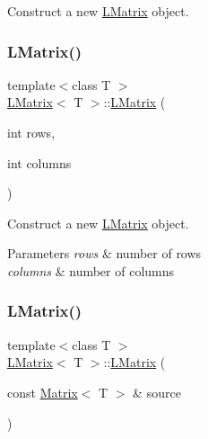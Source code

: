 Construct a new \mbox{\hyperlink{class_l_matrix}{L\+Matrix}} object. 

\mbox{\label{class_l_matrix_a5e031d95fcb4ce79894c52488d224f98}} 
\subsubsection{\texorpdfstring{LMatrix()}{LMatrix()}\hspace{0.1cm}{\footnotesize\ttfamily [2/5]}}
{\footnotesize\ttfamily template$<$class T $>$ \\
\mbox{\hyperlink{class_l_matrix}{L\+Matrix}}$<$ T $>$\+::\mbox{\hyperlink{class_l_matrix}{L\+Matrix}} (\begin{DoxyParamCaption}\item[{int}]{rows,  }\item[{int}]{columns }\end{DoxyParamCaption})}



Construct a new \mbox{\hyperlink{class_l_matrix}{L\+Matrix}} object. 


\begin{DoxyParams}{Parameters}
{\em rows} & number of rows \\
\hline
{\em columns} & number of columns \\
\hline
\end{DoxyParams}
\mbox{\label{class_l_matrix_aa4bc8aa349207a09c467d958d7361b4b}} 
\subsubsection{\texorpdfstring{LMatrix()}{LMatrix()}\hspace{0.1cm}{\footnotesize\ttfamily [3/5]}}
{\footnotesize\ttfamily template$<$class T $>$ \\
\mbox{\hyperlink{class_l_matrix}{L\+Matrix}}$<$ T $>$\+::\mbox{\hyperlink{class_l_matrix}{L\+Matrix}} (\begin{DoxyParamCaption}\item[{const \mbox{\hyperlink{class_matrix}{Matrix}}$<$ T $>$ \&}]{source }\end{DoxyParamCaption})}



